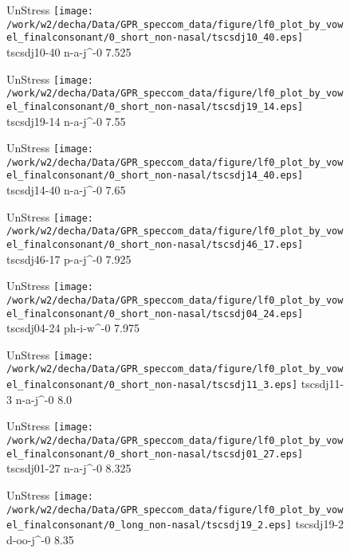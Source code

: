\documentclass{article}
\begin{document}
\begin{figure}[t]
\begin{minipage}[b]{.24\textwidth}
UnStress
\centering
\texttt{[image: /work/w2/decha/Data/GPR\_speccom\_data/figure/lf0\_plot\_by\_vowel\_finalconsonant/0\_short\_non-nasal/tscsdj10\_40.eps]}
tscsdj10-40 n-a-j\textasciicircum-0 7.525
\end{minipage}
\begin{minipage}[b]{.24\textwidth}
UnStress
\centering
\texttt{[image: /work/w2/decha/Data/GPR\_speccom\_data/figure/lf0\_plot\_by\_vowel\_finalconsonant/0\_short\_non-nasal/tscsdj19\_14.eps]}
tscsdj19-14 n-a-j\textasciicircum-0 7.55
\end{minipage}
\begin{minipage}[b]{.24\textwidth}
UnStress
\centering
\texttt{[image: /work/w2/decha/Data/GPR\_speccom\_data/figure/lf0\_plot\_by\_vowel\_finalconsonant/0\_short\_non-nasal/tscsdj14\_40.eps]}
tscsdj14-40 n-a-j\textasciicircum-0 7.65
\end{minipage}
\begin{minipage}[b]{.24\textwidth}
UnStress
\centering
\texttt{[image: /work/w2/decha/Data/GPR\_speccom\_data/figure/lf0\_plot\_by\_vowel\_finalconsonant/0\_short\_non-nasal/tscsdj46\_17.eps]}
tscsdj46-17 p-a-j\textasciicircum-0 7.925
\end{minipage}
\end{figure}
\clearpage
\begin{figure}[t]
\begin{minipage}[b]{.24\textwidth}
UnStress
\centering
\texttt{[image: /work/w2/decha/Data/GPR\_speccom\_data/figure/lf0\_plot\_by\_vowel\_finalconsonant/0\_short\_non-nasal/tscsdj04\_24.eps]}
tscsdj04-24 ph-i-w\textasciicircum-0 7.975
\end{minipage}
\begin{minipage}[b]{.24\textwidth}
UnStress
\centering
\texttt{[image: /work/w2/decha/Data/GPR\_speccom\_data/figure/lf0\_plot\_by\_vowel\_finalconsonant/0\_short\_non-nasal/tscsdj11\_3.eps]}
tscsdj11-3 n-a-j\textasciicircum-0 8.0
\end{minipage}
\begin{minipage}[b]{.24\textwidth}
UnStress
\centering
\texttt{[image: /work/w2/decha/Data/GPR\_speccom\_data/figure/lf0\_plot\_by\_vowel\_finalconsonant/0\_short\_non-nasal/tscsdj01\_27.eps]}
tscsdj01-27 n-a-j\textasciicircum-0 8.325
\end{minipage}
\begin{minipage}[b]{.24\textwidth}
UnStress
\centering
\texttt{[image: /work/w2/decha/Data/GPR\_speccom\_data/figure/lf0\_plot\_by\_vowel\_finalconsonant/0\_long\_non-nasal/tscsdj19\_2.eps]}
tscsdj19-2 d-oo-j\textasciicircum-0 8.35
\end{minipage}
\end{figure}
\end{document}

